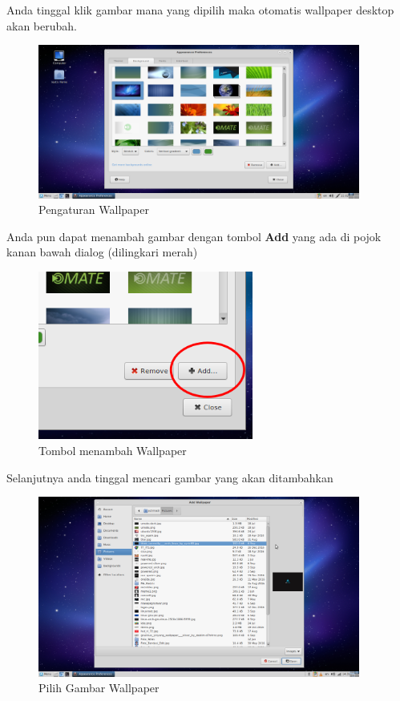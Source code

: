 \documentclass[12pt,]{article}
\begin{document}
	Anda tinggal klik gambar mana yang dipilih maka otomatis wallpaper desktop akan berubah.
	\newpage
	\begin{figure}[h]
		\centering
		\includegraphics[width=300pt]{png/wallpaperdlg2}
		\caption{Pengaturan Wallpaper}
	\end{figure}

	Anda pun dapat menambah gambar dengan tombol \textbf{Add} yang ada di pojok kanan bawah dialog (dilingkari merah)
	
	\begin{figure}[h]
		\centering
		\includegraphics[width=200pt]{png/wallpaperadd}
		\caption{Tombol menambah Wallpaper}
	\end{figure}   

	Selanjutnya anda tinggal mencari gambar yang akan ditambahkan
	
	\begin{figure}[h]
		\centering
		\includegraphics[width=300pt]{png/wallpaperadd2}
		\caption{Pilih Gambar Wallpaper}
	\end{figure}
\end{document}
